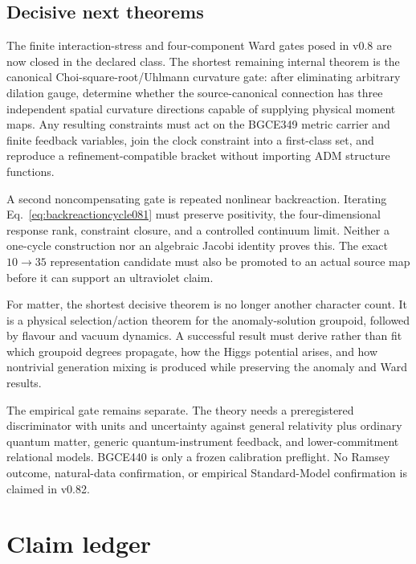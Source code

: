 \documentclass[11pt]{article}
\theoremstyle{definition}
\theoremstyle{remark}
\begin{document}
\subsection{Decisive next theorems}

The finite interaction-stress and four-component Ward gates posed in v0.8 are now closed in the declared class. The shortest remaining internal theorem is the canonical Choi-square-root/Uhlmann curvature gate: after eliminating arbitrary dilation gauge, determine whether the source-canonical connection has three independent spatial curvature directions capable of supplying physical moment maps. Any resulting constraints must act on the BGCE349 metric carrier and finite feedback variables, join the clock constraint into a first-class set, and reproduce a refinement-compatible bracket without importing ADM structure functions.

A second noncompensating gate is repeated nonlinear backreaction. Iterating Eq.~\eqref{eq:backreactioncycle081} must preserve positivity, the four-dimensional response rank, constraint closure, and a controlled continuum limit. Neither a one-cycle construction nor an algebraic Jacobi identity proves this. The exact $10\to35$ representation candidate must also be promoted to an actual source map before it can support an ultraviolet claim.

For matter, the shortest decisive theorem is no longer another character count. It is a physical selection/action theorem for the anomaly-solution groupoid, followed by flavour and vacuum dynamics. A successful result must derive rather than fit which groupoid degrees propagate, how the Higgs potential arises, and how nontrivial generation mixing is produced while preserving the anomaly and Ward results.

The empirical gate remains separate. The theory needs a preregistered discriminator with units and uncertainty against general relativity plus ordinary quantum matter, generic quantum-instrument feedback, and lower-commitment relational models. BGCE440 is only a frozen calibration preflight. No Ramsey outcome, natural-data confirmation, or empirical Standard-Model confirmation is claimed in v0.82.

\section{Claim ledger}
\end{document}
